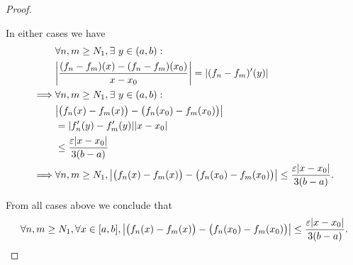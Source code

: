 \begin{proof}
\begin{itemize}
\[              \]
              In either cases we have
              \begin{align*}
                           & \forall n, m \geq N_1, \exists\ y \in (a, b) :                                                                                          \\
                           & \abs{\frac{(f_n - f_m)(x) - (f_n - f_m)(x_0)}{x - x_0}} = \abs{(f_n - f_m)'(y)}                                                         \\
                  \implies & \forall n, m \geq N_1, \exists\ y \in (a, b) :                                                                                          \\
                           & \abs{\big(f_n(x) - f_m(x)\big) - \big(f_n(x_0) - f_m(x_0)\big)}                                                                         \\
                           & = \abs{f_n'(y) - f_m'(y)} \abs{x - x_0}                                                                                                 \\
                           & \leq \frac{\varepsilon \abs{x - x_0}}{3(b - a)}                                                                                         \\
                  \implies & \forall n, m \geq N_1, \abs{\big(f_n(x) - f_m(x)\big) - \big(f_n(x_0) - f_m(x_0)\big)} \leq \frac{\varepsilon \abs{x - x_0}}{3(b - a)}.
              \end{align*}
    \end{itemize}
    From all cases above we conclude that
    \[
        \forall n, m \geq N_1, \forall x \in [a, b], \abs{\big(f_n(x) - f_m(x)\big) - \big(f_n(x_0) - f_m(x_0)\big)} \leq \frac{\varepsilon \abs{x - x_0}}{3(b - a)}.
    \]


\end{proof}
